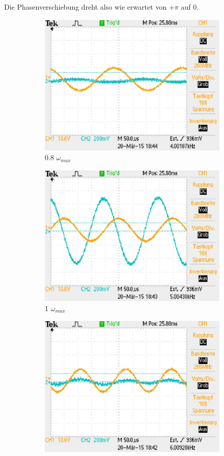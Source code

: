 \documentclass{article}
\begin{document}
Die Phasenverschiebung dreht also wie erwartet von +$\pi$ auf 0.

\begin{figure}
\begin{subfigure}{0.3\textwidth}
\includegraphics[width=0.9\linewidth ]{reso3.eps}
\caption{0.8 $\omega_{max}$}
\end{subfigure}
\begin{subfigure}{0.3\textwidth}
\includegraphics[width=0.9\linewidth]{reso2.eps}
\caption{1 $\omega_{max}$}
\end{subfigure}
\begin{subfigure}{0.3\textwidth}
\includegraphics[width=0.9\linewidth]{reso1.eps}

\end{subfigure}
\end{figure}
\end{document}
